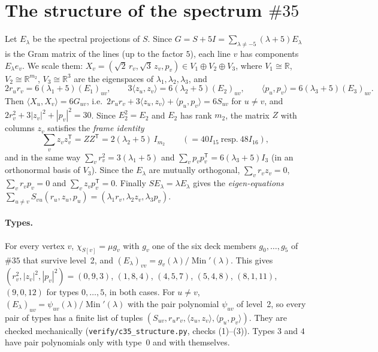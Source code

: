 \documentclass[11pt]{article}
\theoremstyle{definition}
\newcommand{\R}{\mathbb{R}}
\newcommand{\Min}{\operatorname{Min}}
\begin{document}
\section{The structure of the spectrum \texorpdfstring{$\#35$}{\#35}}\label{sec:35}

Let $E_\lambda$ be the spectral projections of $S$. Since $G=S+5I=\sum_{\lambda\ne-5}(\lambda+5)E_\lambda$
is the Gram matrix of the lines (up to the factor $5$), each line $v$ has components $E_\lambda e_v$. We
scale them: $X_v=(\sqrt2\,r_v,\sqrt3\,z_v,p_v)\in V_1\oplus V_2\oplus V_3$, where
$V_1\cong\R$, $V_2\cong\R^{m_2}$, $V_3\cong\R^3$ are the eigenspaces of $\lambda_1,\lambda_2,\lambda_3$, and
\[
2r_ur_v=6(\lambda_1+5)(E_1)_{uv},\qquad 3\langle z_u,z_v\rangle=6(\lambda_2+5)(E_2)_{uv},\qquad
\langle p_u,p_v\rangle=6(\lambda_3+5)(E_3)_{uv}.
\]
Then $\langle X_u,X_v\rangle=6G_{uv}$, i.e.\ $2r_ur_v+3\langle z_u,z_v\rangle+\langle p_u,p_v\rangle=6S_{uv}$
for $u\ne v$, and $2r_v^2+3|z_v|^2+|p_v|^2=30$. Since $E_2^2=E_2$ and $E_2$ has rank $m_2$, the matrix
$Z$ with columns $z_v$ satisfies the \emph{frame identity}
\begin{equation}\label{eq:frame}
\sum_vz_vz_v^{\mathsf T}=ZZ^{\mathsf T}=2(\lambda_2+5)\,I_{m_2}\qquad(=40I_{15}\ \text{resp.}\ 48I_{16}),
\end{equation}
and in the same way $\sum_vr_v^2=3(\lambda_1+5)$ and $\sum_vp_vp_v^{\mathsf T}=6(\lambda_3+5)I_3$ (in an
orthonormal basis of $V_3$). Since the $E_\lambda$ are mutually orthogonal, $\sum_vr_vz_v=0$,
$\sum_vr_vp_v=0$ and $\sum_vz_vp_v^{\mathsf T}=0$. Finally $SE_\lambda=\lambda E_\lambda$ gives the
\emph{eigen-equations} $\sum_{u\ne v}S_{vu}(r_u,z_u,p_u)=(\lambda_1r_v,\lambda_2z_v,\lambda_3p_v)$.

\paragraph{Types.} For every vertex $v$, $\chi_{S[v]}=\mu g_v$ with $g_v$ one of the six deck members
$g_0,\dots,g_5$ of $\#35$ that survive level~2, and $(E_\lambda)_{vv}=g_v(\lambda)/\Min'(\lambda)$. This
gives $(r_v^2,|z_v|^2,|p_v|^2)=(0,9,3)$, $(1,8,4)$, $(4,5,7)$, $(5,4,8)$, $(8,1,11)$, $(9,0,12)$ for
types $0,\dots,5$, in both cases. For $u\ne v$, $(E_\lambda)_{uv}=\psi_{uv}(\lambda)/\Min'(\lambda)$ with the
pair polynomial $\psi_{uv}$ of level~2, so every pair of types has a finite list of tuples
$(S_{uv},r_ur_v,\langle z_u,z_v\rangle,\langle p_u,p_v\rangle)$. They are checked mechanically
(\texttt{verify/c35\_structure.py}, checks (1)--(3)). Types $3$ and $4$ have pair polynomials only with
type~$0$ and with themselves.
\end{document}
